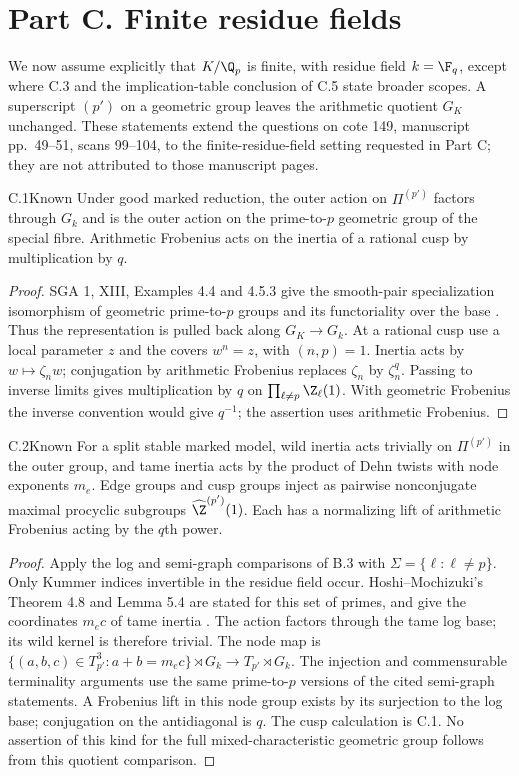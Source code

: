 \section{Part C. Finite residue fields}
\label{sec:C}
We now assume explicitly that $K/\Q_p$ is finite, with residue field
$k=\F_q$, except where C.3 and the implication-table conclusion of C.5
state broader scopes. A superscript $(p')$ on a geometric group leaves the
arithmetic quotient $G_K$ unchanged. These statements extend the questions
on cote 149, manuscript pp.~49--51, scans 99--104, to the finite-residue-field
setting requested in Part C; they are not attributed to those manuscript pages.

\begin{claim}{C.1}{Known}
Under good marked reduction, the outer action on $\Pi^{(p')}$ factors
through $G_k$ and is the outer action on the prime-to-$p$ geometric group of
the special fibre. Arithmetic Frobenius acts on the inertia of a rational
cusp by multiplication by $q$.
\end{claim}
\begin{proof}
SGA 1, XIII, Examples 4.4 and 4.5.3 give the smooth-pair specialization
isomorphism of geometric prime-to-$p$ groups and its functoriality over
the base \citep{BC_SGA1}. Thus the representation is pulled back along
$G_K\to G_k$. At a rational cusp use a local parameter $z$ and the covers
$w^n=z$, with $(n,p)=1$. Inertia acts by $w\mapsto\zeta_nw$;
conjugation by arithmetic Frobenius replaces $\zeta_n$ by $\zeta_n^q$.
Passing to inverse limits gives multiplication by $q$ on
$\prod_{\ell\ne p}\Z_\ell(1)$. With geometric Frobenius the inverse
convention would give $q^{-1}$; the assertion uses arithmetic Frobenius.
\end{proof}

\begin{claim}{C.2}{Known}
For a split stable marked model, wild inertia acts trivially on
$\Pi^{(p')}$ in the outer group, and tame inertia acts by the product of
Dehn twists with node exponents $m_e$. Edge groups and cusp groups inject
as pairwise nonconjugate maximal procyclic subgroups
$\widehat\Z^{(p')}(1)$. Each has a normalizing lift of arithmetic Frobenius
acting by the $q$th power.
\end{claim}
\begin{proof}
Apply the log and semi-graph comparisons of B.3 with
$\Sigma=\{\ell:\ell\ne p\}$. Only Kummer indices invertible in the residue
field occur. Hoshi--Mochizuki's Theorem 4.8 and Lemma 5.4 are stated for
this set of primes, and give the coordinates $m_ec$ of tame inertia
\citep{BC_HMTopics}. The action factors through the tame log base; its
wild kernel is therefore trivial. The node map is
$\{(a,b,c)\in T_{p'}^3:a+b=m_ec\}\rtimes G_k\to T_{p'}\rtimes G_k$.
The injection and commensurable terminality arguments use the same
prime-to-$p$ versions of the cited semi-graph statements. A Frobenius lift
in this node group exists by its surjection to the log base; conjugation
on the antidiagonal is $q$. The cusp calculation is C.1. No assertion of
this kind for the full mixed-characteristic geometric group follows from
this quotient comparison.
\end{proof}

